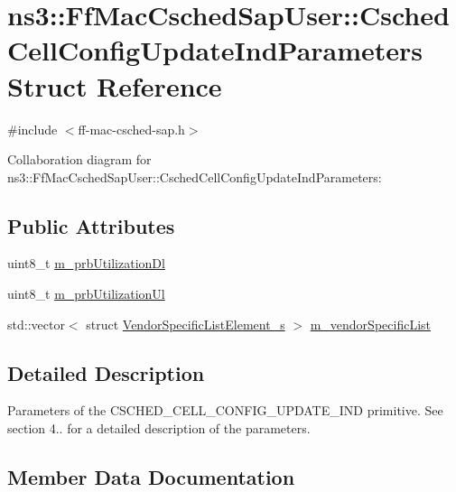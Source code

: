 \hypertarget{structns3_1_1FfMacCschedSapUser_1_1CschedCellConfigUpdateIndParameters}{}\section{ns3\+:\+:Ff\+Mac\+Csched\+Sap\+User\+:\+:Csched\+Cell\+Config\+Update\+Ind\+Parameters Struct Reference}
\label{structns3_1_1FfMacCschedSapUser_1_1CschedCellConfigUpdateIndParameters}


{\ttfamily \#include $<$ff-\/mac-\/csched-\/sap.\+h$>$}



Collaboration diagram for ns3\+:\+:Ff\+Mac\+Csched\+Sap\+User\+:\+:Csched\+Cell\+Config\+Update\+Ind\+Parameters\+:
\subsection*{Public Attributes}
\begin{DoxyCompactItemize}
\item 
uint8\+\_\+t \hyperlink{structns3_1_1FfMacCschedSapUser_1_1CschedCellConfigUpdateIndParameters_aff8a5a5d0aecb6d5cb61bf34f03bdc6a}{m\+\_\+prb\+Utilization\+Dl}
\item 
uint8\+\_\+t \hyperlink{structns3_1_1FfMacCschedSapUser_1_1CschedCellConfigUpdateIndParameters_a459f3eae278f1cc51825eb4d60639fcf}{m\+\_\+prb\+Utilization\+Ul}
\item 
std\+::vector$<$ struct \hyperlink{structns3_1_1VendorSpecificListElement__s}{Vendor\+Specific\+List\+Element\+\_\+s} $>$ \hyperlink{structns3_1_1FfMacCschedSapUser_1_1CschedCellConfigUpdateIndParameters_ab961d93445d20b376c736083f2115713}{m\+\_\+vendor\+Specific\+List}
\end{DoxyCompactItemize}


\subsection{Detailed Description}
Parameters of the C\+S\+C\+H\+E\+D\+\_\+\+C\+E\+L\+L\+\_\+\+C\+O\+N\+F\+I\+G\+\_\+\+U\+P\+D\+A\+T\+E\+\_\+\+I\+ND primitive. See section 4.. for a detailed description of the parameters. 

\subsection{Member Data Documentation}
